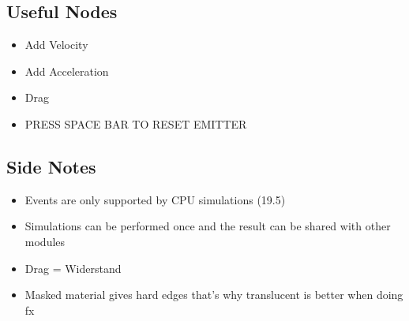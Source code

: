             \subsection{Useful Nodes}
                \begin{itemize}
                    \item Add Velocity
                    \item Add Acceleration
                    \item Drag
                    \item PRESS SPACE BAR TO RESET EMITTER
                \end{itemize}
                
            \subsection{Side Notes}
            \begin{itemize}
                \item Events are only supported by CPU simulations (19.5)
                \item Simulations can be performed once and the result can be shared with other modules
                \item Drag = Widerstand
                \item Masked material gives hard edges that's why translucent is better when doing fx
            \end{itemize}


